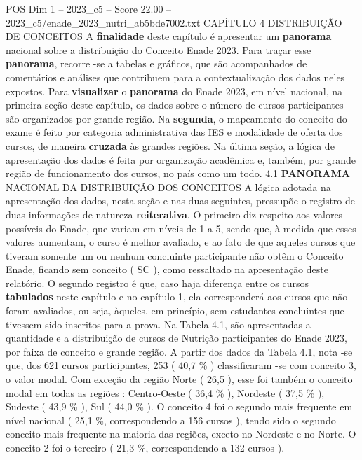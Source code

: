 \begin{textsample}{POS Dim 1 – 2023\_c5 – Score 22.00 – 2023\_c5/enade\_2023\_nutri\_ab5bde7002.txt}  \label{ex:f1_pos_009}
CAPÍTULO 4 DISTRIBUIÇÃO DE CONCEITOS A \textbf{finalidade} deste capítulo é apresentar um \textbf{panorama} nacional sobre a distribuição do Conceito Enade 2023.
Para traçar esse \textbf{panorama}, recorre -se a tabelas e gráficos, que são acompanhados de comentários e análises que contribuem para a contextualização dos dados neles expostos.
Para \textbf{visualizar} o \textbf{panorama} do Enade 2023, em nível nacional, na primeira seção deste capítulo, os dados sobre o número de cursos participantes são organizados por grande região.
Na \textbf{segunda}, o mapeamento do conceito do exame é feito por categoria administrativa das IES e modalidade de oferta dos cursos, de maneira \textbf{cruzada} às grandes regiões.
Na última seção, a lógica de apresentação dos dados é feita por organização acadêmica e, também, por grande região de funcionamento dos cursos, no país como um todo. 4.1 \textbf{PANORAMA} NACIONAL DA DISTRIBUIÇÃO DOS CONCEITOS A lógica adotada na apresentação dos dados, nesta seção e nas duas seguintes, pressupõe o registro de duas informações de natureza \textbf{reiterativa}.
O primeiro diz respeito aos valores possíveis do Enade, que variam em níveis de 1 a 5, sendo que, à medida que esses valores aumentam, o curso é melhor avaliado, e ao fato de que aqueles cursos que tiveram somente um ou nenhum concluinte participante não obtêm o Conceito Enade, ficando sem conceito ( SC ), como ressaltado na apresentação deste relatório.
O segundo registro é que, caso haja diferença entre os cursos \textbf{tabulados} neste capítulo e no capítulo 1, ela corresponderá aos cursos que não foram avaliados, ou seja, àqueles, em princípio, sem estudantes concluintes que tivessem sido inscritos para a prova.
Na Tabela 4.1, são apresentadas a quantidade e a distribuição de cursos de Nutrição participantes do Enade 2023, por faixa de conceito e grande região.
A partir dos dados da Tabela 4.1, nota -se que, dos 621 cursos participantes, 253 ( 40,7 \% ) classificaram -se com conceito 3, o valor modal.
Com exceção da região Norte ( 26,5 ), esse foi também o conceito modal em todas as regiões : Centro-Oeste ( 36,4 \% ), Nordeste ( 37,5 \% ), Sudeste ( 43,9 \% ), Sul ( 44,0 \% ).
O conceito 4 foi o segundo mais frequente em nível nacional ( 25,1 \%, correspondendo a 156 cursos ), tendo sido o segundo conceito mais frequente na maioria das regiões, exceto no Nordeste e no Norte.
O conceito 2 foi o terceiro ( 21,3 \%, correspondendo a 132 cursos ).

\end{textsample}
